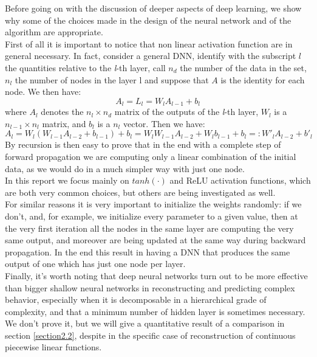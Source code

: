 \documentclass[12pt, a4paper]{report}
\theoremstyle{definition}
\begin{document}
\noindent Before going on with the discussion of deeper aspects of deep learning, we show why some of the choices made in the design of the neural network and of the algorithm are appropriate.\\
First of all it is important to notice that non linear activation function are in general necessary. In fact, consider a general DNN, identify with the subscript $l$ the quantities relative to the \textit{l}-th layer, call $n_d$ the number of the data in the set, $n_l$ the number of nodes in the layer l and suppose that $A$ is the identity for each node. We then have:
\[
A_l = L_l = W_l A_{l-1} + b_l
\]
where $A_{l}$ denotes the $n_l \times n_d$ matrix of the outputs of the \textit{l}-th layer, $W_l$ is a $n_{l-1} \times n_l $ matrix, and $b_l$ is a $n_l$ vector. Then we have:
\[
A_l=W_l(W_{l-1}A_{l-2} + b_{l-1})+ b_l = W_lW_{l-1}A_{l-2}+W_lb_{l-1}+b_l =: W'_l A_{l-2} +  b'_l
\]
By recursion is then easy to prove that in the end with a complete step of forward propagation we are computing only a linear combination of the initial data, as we would do in a much simpler way with just one node.\\
In this report we focus mainly on $tanh(\cdot)$ and ReLU activation functions, which are both very common choices, but others are being investigated as well.\\
For similar reasons it is very important to initialize the weights randomly: if we don't, and, for example, we initialize every parameter to a given value, then at the very first iteration all the nodes in the same layer are computing the very same output, and moreover are being updated at the same way during backward propagation. In the end this result in having a DNN that produces the same output of one which has just one node per layer.\\
Finally, it's worth noting that deep neural networks turn out to be more effective than bigger shallow neural networks in reconstructing and predicting complex behavior, especially when it is decomposable in a hierarchical grade of complexity, and that a minimum number of hidden layer is sometimes necessary. We don't prove it, but we will give a quantitative result of a comparison in section \ref{section2.2}, despite in the specific case of reconstruction of continuous piecewise linear functions.
\end{document}
